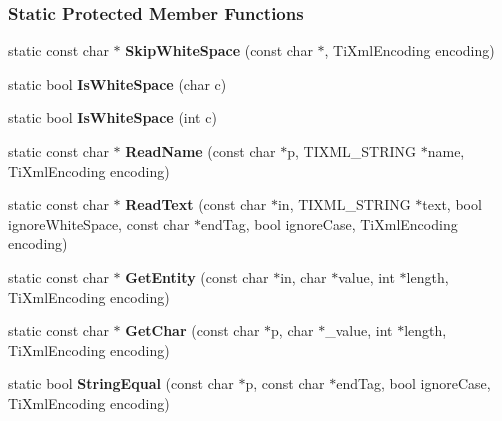 \subsubsection*{Static Protected Member Functions}
\begin{DoxyCompactItemize}
\item 
\hypertarget{class_ti_xml_base_ac0c3d66d8a9e6996a1fa016275e16875}{
static const char $\ast$ {\bfseries SkipWhiteSpace} (const char $\ast$, TiXmlEncoding encoding)}
\label{class_ti_xml_base_ac0c3d66d8a9e6996a1fa016275e16875}

\item 
\hypertarget{class_ti_xml_base_af56296d561c0bab4bc8e198cdcf5c48e}{
static bool {\bfseries IsWhiteSpace} (char c)}
\label{class_ti_xml_base_af56296d561c0bab4bc8e198cdcf5c48e}

\item 
\hypertarget{class_ti_xml_base_a3de391ea9f4c4a8aa10d04480b048795}{
static bool {\bfseries IsWhiteSpace} (int c)}
\label{class_ti_xml_base_a3de391ea9f4c4a8aa10d04480b048795}

\item 
\hypertarget{class_ti_xml_base_a1c21a6ab5f7b503acd91f35f183734b3}{
static const char $\ast$ {\bfseries ReadName} (const char $\ast$p, TIXML\_\-STRING $\ast$name, TiXmlEncoding encoding)}
\label{class_ti_xml_base_a1c21a6ab5f7b503acd91f35f183734b3}

\item 
\hypertarget{class_ti_xml_base_aa646c74921aa33156968b802bbf5566e}{
static const char $\ast$ {\bfseries ReadText} (const char $\ast$in, TIXML\_\-STRING $\ast$text, bool ignoreWhiteSpace, const char $\ast$endTag, bool ignoreCase, TiXmlEncoding encoding)}
\label{class_ti_xml_base_aa646c74921aa33156968b802bbf5566e}

\item 
\hypertarget{class_ti_xml_base_ac5c08bf3deffcda0bf8ce2958372b584}{
static const char $\ast$ {\bfseries GetEntity} (const char $\ast$in, char $\ast$value, int $\ast$length, TiXmlEncoding encoding)}
\label{class_ti_xml_base_ac5c08bf3deffcda0bf8ce2958372b584}

\item 
\hypertarget{class_ti_xml_base_a5b0fde72d6f662ae1fd6303195d2159b}{
static const char $\ast$ {\bfseries GetChar} (const char $\ast$p, char $\ast$\_\-value, int $\ast$length, TiXmlEncoding encoding)}
\label{class_ti_xml_base_a5b0fde72d6f662ae1fd6303195d2159b}

\item 
\hypertarget{class_ti_xml_base_a51631e6986179558b9e5850723ed165a}{
static bool {\bfseries StringEqual} (const char $\ast$p, const char $\ast$endTag, bool ignoreCase, TiXmlEncoding encoding)}
\label{class_ti_xml_base_a51631e6986179558b9e5850723ed165a}


\end{DoxyCompactItemize}
